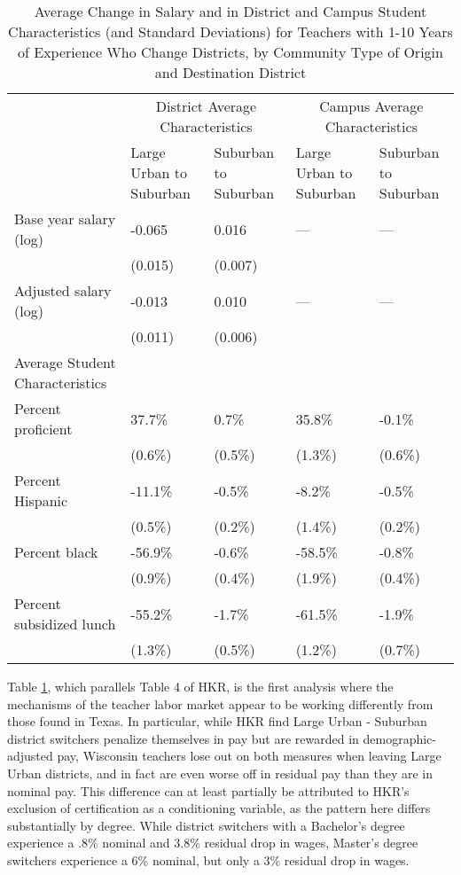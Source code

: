 \documentclass[12pt,]{article}
\begin{document}
\begin{table}[htbp]
\centering
\begin{tabular}{lp{}p{}p{}p{}}
  \hline
 & \multicolumn{2}{c}{District Average Characteristics} & \multicolumn{2}{c}{Campus Average Characteristics}\\ \cline{2-5}
 & Large Urban to Suburban & Suburban to Suburban & Large Urban to Suburban & Suburban to Suburban \\
  \hline
Base year salary (log) & -0.065 & 0.016 & --- & --- \\ 
   & (0.015) & (0.007) &  &  \\ 
  Adjusted salary (log) & -0.013 & 0.010 & --- & --- \\ 
   & (0.011) & (0.006) &  &  \\ 
Average Student Characteristics & & & & \\
  \quad Percent proficient & 37.7\% & 0.7\% & 35.8\% & -0.1\% \\ 
   & (0.6\%) & (0.5\%) & (1.3\%) & (0.6\%) \\ 
  \quad Percent Hispanic & -11.1\% & -0.5\% & -8.2\% & -0.5\% \\ 
   & (0.5\%) & (0.2\%) & (1.4\%) & (0.2\%) \\ 
  \quad Percent black & -56.9\% & -0.6\% & -58.5\% & -0.8\% \\ 
   & (0.9\%) & (0.4\%) & (1.9\%) & (0.4\%) \\ 
  \quad Percent subsidized lunch & -55.2\% & -1.7\% & -61.5\% & -1.9\% \\ 
   & (1.3\%) & (0.5\%) & (1.2\%) & (0.7\%) \\ 
   \hline
\end{tabular}
\caption{Average Change in Salary and in District and Campus Student Characteristics (and Standard Deviations) for Teachers with 1-10 Years of Experience Who Change Districts, by Community Type of Origin and Destination District} 
\label{tbl:change_by_urb}
\end{table}

Table \ref{tbl:change_by_urb}, which parallels Table 4 of HKR, is the
first analysis where the mechanisms of the teacher labor market appear
to be working differently from those found in Texas. In particular,
while HKR find Large Urban - Suburban district switchers penalize
themselves in pay but are rewarded in demographic-adjusted pay,
Wisconsin teachers lose out on both measures when leaving Large Urban
districts, and in fact are even worse off in residual pay than they are
in nominal pay. This difference can at least partially be attributed to
HKR's exclusion of certification as a conditioning variable, as the
pattern here differs substantially by degree. While district switchers
with a Bachelor's degree experience a .8\% nominal and 3.8\% residual
drop in wages, Master's degree switchers experience a 6\% nominal, but
only a 3\% residual drop in wages.
\end{document}
